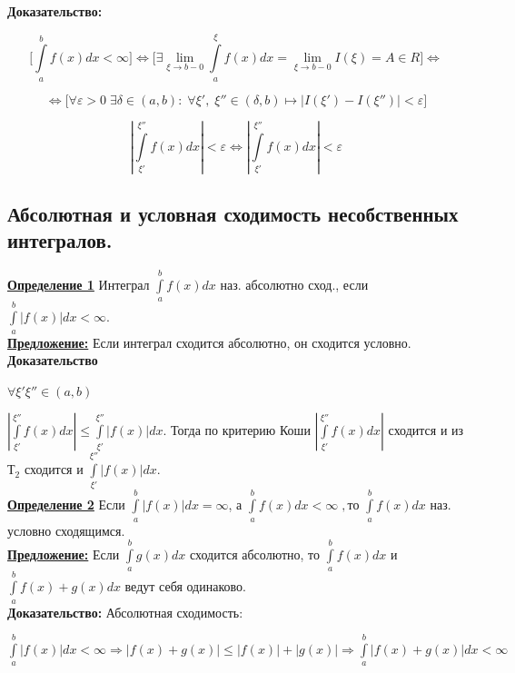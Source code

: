 \documentclass[a4paper,12pt]{article} %
\renewcommand {\leq}{\leqslant}
\begin{document}
\textbf{Доказательство:}

$$\bigl[ \int\limits_a^{b} f(x) dx < \infty \bigr] \Longleftrightarrow \bigl[ \exists \lim\limits_{\xi \rightarrow b-0} \int\limits_a^{\xi} f(x) dx = \lim\limits_{\xi \rightarrow b-0} I(\xi) = A \in R \bigr] \Longleftrightarrow$$ 

$$ \Longleftrightarrow \bigl[\forall \varepsilon > 0\; \exists \delta \in (a, b):\; \forall \xi',\; \xi'' \in (\delta, b) \longmapsto |I(\xi') - I(\xi'')| < \varepsilon \bigr]$$

$$|\int\limits_{\xi'}^{\xi''} f(x) dx| < \varepsilon \Longleftrightarrow |\int\limits_{\xi'}^{\xi''} f(x) dx| < \varepsilon$$


\subsection{Абсолютная и условная сходимость несобственных интегралов.}

\underline{\textbf{Определение 1}} Интеграл $\int\limits_{a}^{b} f(x) dx$ наз. абсолютно сход., если $\int\limits_{a}^{b} |f(x)| dx < \infty$.\\

\underline{\textbf{Предложение:}} Если интеграл сходится абсолютно, он сходится условно.\\

\textbf{Доказательство}

$\forall \xi' \xi'' \in (a, b)$

$|\int\limits_{\xi'}^{\xi''} f(x) dx| \leq \int\limits_{\xi'}^{\xi''} |f(x)| dx$. Тогда по критерию Коши
$|\int\limits_{\xi'}^{\xi''} f(x) dx|$ сходится 
и из $Т_2$ сходится и $\int\limits_{\xi'}^{\xi''} |f(x)| dx$.\\

\underline{\textbf{Определение 2}} Если $\int\limits_{a}^{b} |f(x)| dx = \infty$, а $\int\limits_{a}^{b} f(x) dx < \infty\;  , то$ $\int\limits_{a}^{b} f(x) dx$ наз. условно сходящимся.\\

\underline{\textbf{Предложение:}} Если $\int\limits_{a}^{b} g(x) dx$ сходится абсолютно, то $\int\limits_{a}^{b} f(x) dx$ и $\int\limits_{a}^{b} f(x)+g(x) dx$ ведут себя одинаково.\\

\textbf{Доказательство:} Абсолютная сходимость:

$\int\limits_{a}^{b} |f(x)| dx < \infty \Rightarrow |f(x) +g(x)| \leq |f(x)| + |g(x)| \Rightarrow \int\limits_a^b |f(x) +g(x)| dx < \infty$ 
\end{document}

